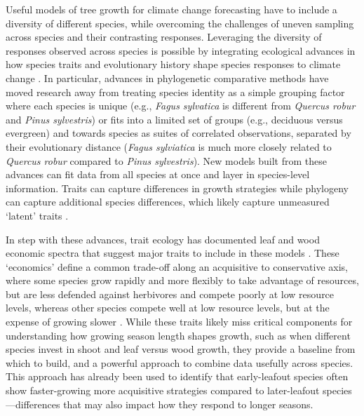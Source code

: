 \documentclass[11pt]{article}
\newcommand{\R}[1]{\label{#1}\linelabel{#1}}
\begin{document}
\R{startframework}Useful models of tree growth for climate change forecasting have to include a diversity of different species, while overcoming the challenges of uneven sampling across species and their contrasting responses. Leveraging the diversity of responses observed across species is possible by integrating ecological advances in how species traits and evolutionary history shape species responses to climate change \citep{cornwell2017phylogenetic}. In particular, advances in phylogenetic comparative methods \citep{Webb:2002or} have moved research away from treating species identity as a simple grouping factor where each species is unique (e.g., \emph{Fagus sylvatica} is different from \emph{Quercus robur} and \emph{Pinus sylvestris}) or fits into a limited set of groups (e.g., deciduous versus evergreen) and towards species as suites of correlated observations, separated by their evolutionary distance (\emph{Fagus sylviatica} is much more closely related to \emph{Quercus robur} compared to \emph{Pinus sylvestris}). New models built from these advances can fit data from all species at once and layer in species-level information.  Traits can capture differences in growth strategies while phylogeny can capture additional species differences, which likely capture unmeasured `latent' traits \citep[][]{pearse2019interaction,morales2024phylogenetic}. %

In step with these advances, trait ecology has documented leaf and wood economic spectra that suggest major traits to include in these models \citep[with related databases of these traits often available,][]{Chave2009,diaz2016}. These `economics' define a common trade-off along an acquisitive to conservative axis, where some species grow rapidly and more flexibly to take advantage of resources, but are less defended against herbivores and compete poorly at low resource levels, whereas other species compete well at low resource levels, but at the expense of growing slower  \citep[][]{Grime:1977sw,Chave2009,diaz2016}. While these traits likely miss critical components for understanding how growing season length shapes growth, such as when different species invest in shoot and leaf versus wood growth, they provide a baseline from which to build, and a powerful approach to combine data usefully across species. This approach has already been used to identify that early-leafout species often show faster-growing more acquisitive strategies compared to later-leafout species \citep{cleland2024effects}---differences that may also impact how they respond to longer seasons. 
\end{document}
